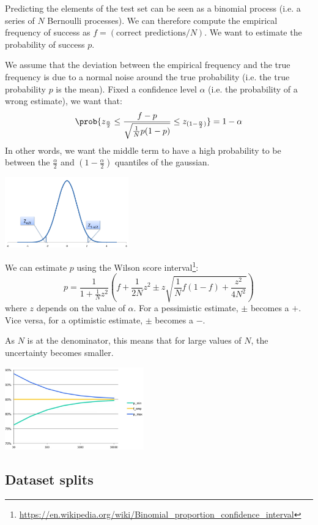 Predicting the elements of the test set can be seen as a binomial process (i.e. a series of $N$ Bernoulli processes).
We can therefore compute the empirical frequency of success as $f = (\text{correct predictions}/N)$.
We want to estimate the probability of success $p$.

We assume that the deviation between the empirical frequency and the true frequency is due to a 
normal noise around the true probability (i.e. the true probability $p$ is the mean).
Fixed a confidence level $\alpha$ (i.e. the probability of a wrong estimate),
we want that:
\[ \prob{ z_{\frac{\alpha}{2}} \leq \frac{f-p}{\sqrt{\frac{1}{N}p(1-p)}} \leq z_{(1-\frac{\alpha}{2})} } = 1 - \alpha \]
In other words, we want the middle term to have a high probability to 
be between the $\frac{\alpha}{2}$ and $(1-\frac{\alpha}{2})$ quantiles of the gaussian.
\begin{center}
    \includegraphics[width=0.4\textwidth]{img/normal_quantile_test_error.png}
\end{center}

We can estimate $p$ using the Wilson score interval\footnote{\url{https://en.wikipedia.org/wiki/Binomial_proportion_confidence_interval}}:
\[ p = \frac{1}{1+\frac{1}{N}z^2} \left( f + \frac{1}{2N}z^2 \pm z\sqrt{\frac{1}{N}f(1-f) + \frac{z^2}{4N^2}} \right) \]
where $z$ depends on the value of $\alpha$.
For a pessimistic estimate, $\pm$ becomes a $+$. Vice versa, for a optimistic estimate, $\pm$ becomes a $-$.

As $N$ is at the denominator, this means that for large values of $N$, the uncertainty becomes smaller.
\begin{center}
    \includegraphics[width=0.45\textwidth]{img/confidence_interval.png}
\end{center}

\subsection{Dataset splits}

